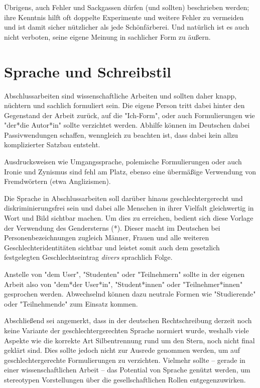Übrigens, auch Fehler und Sackgassen dürfen (und sollten) beschrieben werden;
ihre Kenntnis hilft oft doppelte Experimente und weitere Fehler zu vermeiden
und ist damit sicher nützlicher als jede Schönfärberei. Und natürlich ist es
auch nicht verboten, seine eigene Meinung in sachlicher Form zu äußern.


\section{Sprache und Schreibstil}

Abschlussarbeiten sind wissenschaftliche Arbeiten und sollten daher knapp,
nüchtern und sachlich formuliert sein. Die eigene Person tritt dabei hinter
den Gegenstand der Arbeit zurück, auf die "Ich-Form", oder auch Formulierungen
wie "der*die Autor*in" sollte verzichtet werden. Abhilfe können im Deutschen
dabei Passivwendungen schaffen, wenngleich zu beachten ist, dass dabei kein
allzu komplizierter Satzbau entsteht.

Ausdrucksweisen wie Umgangssprache, polemische Formulierungen oder auch
Ironie und Zynismus sind fehl am Platz, ebenso eine übermäßige Verwendung von
Fremdwörtern (etwa Anglizismen).

Die Sprache in Abschlussarbeiten soll darüber hinaus geschlechtergerecht und
diskriminierungsfrei sein und dabei alle Menschen in ihrer Vielfalt gleichwertig
in Wort und Bild sichtbar machen. Um dies zu erreichen, bedient sich diese
Vorlage der Verwendung des Gendersterns (*). Dieser macht im Deutschen bei
Personenbezeichnungen zugleich Männer, Frauen und alle weiteren
Geschlechteridentitäten sichtbar und leistet somit auch dem gesetzlich
festgelegten Geschlechtseintrag \emph{divers} sprachlich Folge.

Anstelle von "dem User", "Studenten" oder "Teilnehmern" sollte in der eigenen
Arbeit also von "dem*der User*in", "Student*innen" oder "Teilnehmer*innen"
gesprochen werden. Abwechselnd können dazu neutrale Formen wie "Studierende"
oder "Teilnehmende" zum Einsatz kommen.

Abschließend sei angemerkt, dass in der deutschen Rechtschreibung derzeit noch
keine Variante der geschlechtergerechten Sprache normiert wurde, weshalb viele
Aspekte wie die korrekte Art Silbentrennung rund um den Stern, noch nicht final
geklärt sind. Dies sollte jedoch nicht zur Ausrede genommen werden, um auf
geschlechtergerechte Formulierungen zu verzichten. Vielmehr sollte -- gerade in
einer wissenschaftlichen Arbeit -- das Potential von Sprache genützt werden, um
stereotypen Vorstellungen über die gesellschaftlichen Rollen entgegenzuwirken.


